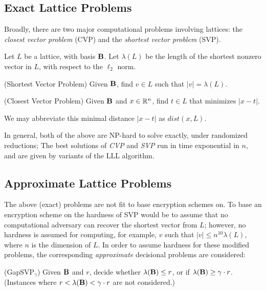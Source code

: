 \subsection{Exact Lattice Problems}

Broadly, there are two major computational problems involving lattices: the \emph{closest vector problem} (CVP) and the \emph{shortest vector problem} (SVP).


Let $L$ be a lattice, with basis $\textbf{B}$. Let $\lambda(L)$ be the length of the shortest nonzero vector in $L$, with respect to the $\ell_2$ norm. %

\begin{definition}(Shortest Vector Problem)
Given $\textbf{B}$, find $v \in L$ such that $|v| = \lambda(L)$.
\end{definition}

\begin{definition}(Closest Vector Problem)
Given $\textbf{B}$ and $x \in \mathbb{R}^n$, find $t \in L$ that minimizes $|x - t|$.
\end{definition}

We may abbreviate this minimal distance $|x - t|$ as $\textit{dist}(x, L)$.


In general, both of the above are NP-hard to solve exactly, under randomized reductions; The best solutions of \emph{CVP} and \emph{SVP} run in time exponential in $n$, and are given by variants of the LLL algorithm. \cite{Khot2010}

\subsection{Approximate Lattice Problems} \label{sec: latticeproblems}
The above (exact) problems are not fit to base encryption schemes on. To base an encryption scheme on the hardness of SVP would be to assume that no computational adversary can recover the shortest vector from $L$; however, no hardness is assumed for computing, for example, $v$ such that $|v| \leq n^{10} \lambda(L)$, where $n$ is the dimension of $L$. In order to assume hardness for these modified problems, the corresponding \emph{approximate} decisional problems are considered:

\begin{definition}{(GapSVP$_\gamma$)}
Given $\textbf{B}$ and $r$, decide whether $\lambda(\textbf{B}) \leq r$, or if $\lambda(\textbf{B}) \geq \gamma \cdot r$. (Instances where $r < \lambda(\textbf{B}) < \gamma \cdot r$ are not considered.)
\end{definition}

